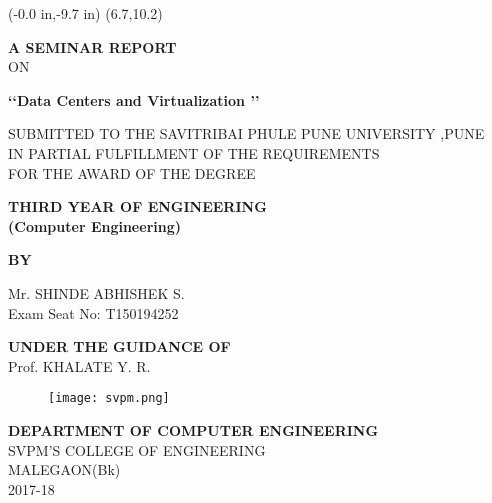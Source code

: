 \documentclass[12pt,a4paper]{report}
\begin{document}
\newpage
\pagestyle{empty}
	\thisfancyput(-0.0 in,-9.7 in){%
\setlength{\unitlength}{1 in}\framebox(6.7,10.2)}
\begin{center}
      \vspace{2 in}
      \textbf{A SEMINAR REPORT}
      \vspace{0.2 in}\\
       ON
			\end{center}
\vspace{0.1 in}
	\begin{center}
		\textbf{\large \lq \lq Data Centers and Virtualization  \rq \rq}
	\end{center}
     \vspace{0.3 in}
	
		\begin{center}
	    SUBMITTED TO THE SAVITRIBAI PHULE PUNE UNIVERSITY ,PUNE \\
	    IN PARTIAL FULFILLMENT OF THE REQUIREMENTS\\
	    FOR THE AWARD OF THE DEGREE 
	\end{center}
	\vspace{0.2 in}
	
	\begin{center}
	   \textbf{THIRD YEAR OF ENGINEERING \\
	   (Computer Engineering)}
	\end{center}
	\vspace{0.1 in}
	
	\begin{center}
	   \textbf{BY}
	\end{center}
	\vspace{0.1 in}
	
	\begin{center}
	   Mr. SHINDE ABHISHEK S.  \\ Exam Seat No: T150194252
	\end{center}
	\vspace{0.1 in}
	
	\begin{center}
	  \textbf{UNDER THE GUIDANCE OF}\\ 
	  Prof. KHALATE Y. R.
	\end{center}
		\begin{center}
	  \begin{figure}[h]
			\centering
			\texttt{[image: svpm.png]}
		\end{figure}
	\end{center}
		\begin{center}
	  \textbf{DEPARTMENT OF COMPUTER ENGINEERING}\\
	  SVPM'S COLLEGE OF ENGINEERING\\
	  MALEGAON(Bk) \\
	   2017-18
	  
	\end{center}
\end{document}
